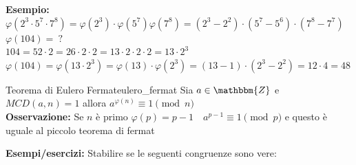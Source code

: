 \documentclass[12pt, letterpaper]{report}
\newcounter{theorem}
\newcommand{\nmu}{}
\begin{document}
		\textbf{Esempio:} $\varphi(2^3 \cdot 5^7 \cdot 7^8) = \varphi(2^3) \cdot \varphi(5^7) \varphi(7^8) = (2^3 - 2^2) \cdot (5^7 - 5^6) \cdot (7^8 - 7^7)$ \\
		$\varphi(104) =\ ?$ \\
		$104 = 52 \cdot 2 = 26 \cdot 2 \cdot 2 = 13 \cdot 2 \cdot 2 \cdot 2 = 13 \cdot 2^3$ \\
		$\varphi(104) = \varphi(13 \cdot 2^3) = \varphi(13) \cdot \varphi(2^3) = (13 -1) \cdot (2^3 - 2^2) = 12 \cdot 4 = 48$
		\begin{theorem}{\nmu Teorema di Eulero Fermat}{eulero_fermat}
			Sia $a \in \mathbbm{Z}$ e $MCD(a, n) = 1$ allora $a^{\varphi(n)} \equiv 1 \pmod{n}$ \\
			\textbf{Osservazione:} Se $n$ è primo $\varphi(p) = p - 1 \quad a^{p-1} \equiv 1 \pmod{p}$ e questo è uguale al piccolo teorema di fermat
		\end{theorem}
		\textbf{Esempi/esercizi:} Stabilire se le seguenti congruenze sono vere:
\end{document}
